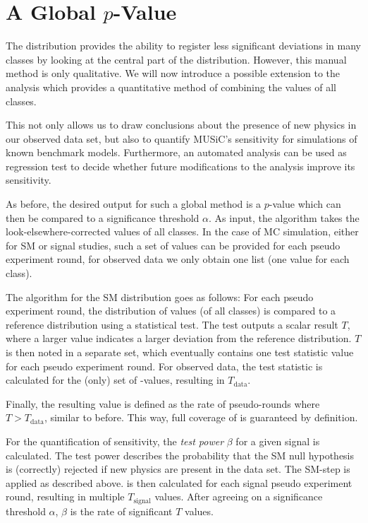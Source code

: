 \section{A Global $p$-Value}
\label{sec:global_pvalue}

\newcommand{\TSphat}{\ensuremath{T}\xspace}

The \ptilde distribution provides the ability to register less significant deviations in many classes by looking at the central part of the distribution. However, this manual method is only qualitative. We will now introduce a possible extension to the analysis which provides a quantitative method of combining the \ptilde values of all classes.

This not only allows us to draw conclusions about the presence of new physics in our observed data set, but also to quantify \ac{MUSiC}'s sensitivity for simulations of known benchmark models. Furthermore, an automated analysis can be used as regression test to decide whether future modifications to the analysis improve its sensitivity.

As before, the desired output for such a global method is a $p$-value which can then be compared to a significance threshold $\alpha$.
As input, the algorithm takes the look-elsewhere-corrected \ptilde values of all classes. In the case of \ac{MC} simulation, either for \ac{SM} or signal studies, such a set of \ptilde values can be provided for each pseudo experiment round, for observed data we only obtain one list (one value for each class).

The algorithm for the \ac{SM} distribution goes as follows: For each pseudo experiment round, the distribution of \ptilde values (of all classes) is compared to a reference distribution using a statistical test. The test outputs a scalar result \TSphat, where a larger value indicates a larger deviation from the reference distribution. \TSphat is then noted in a separate set, which eventually contains one test statistic value for each pseudo experiment round.
For observed data, the test statistic is calculated for the (only) set of \ptilde-values, resulting in $\TSphat_\text{data}$.

Finally, the resulting \phat value is defined as the rate of pseudo-rounds where $\TSphat > \TSphat_\text{data}$, similar to \ptilde before. This way, full coverage of \phat is guaranteed by definition.

For the quantification of sensitivity, the \emph{test power} $\beta$ for a given signal is calculated. The test power describes the probability that the \ac{SM} null hypothesis is (correctly) rejected if new physics are present in the data set. 
The \ac{SM}-step is applied as described above. \phat is then calculated for each signal pseudo experiment round, resulting in multiple $\TSphat_\text{signal}$ values. After agreeing on a significance threshold $\alpha$, $\beta$ is the rate of significant \TSphat values.

